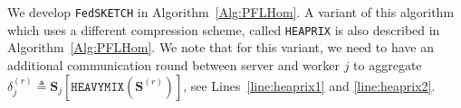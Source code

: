 \documentclass[twoside]{article}
\begin{document}
We develop \texttt{FedSKETCH} in Algorithm~\ref{Alg:PFLHom}. 
A variant of this algorithm which uses a different compression scheme, called \texttt{HEAPRIX} is also described in Algorithm~\ref{Alg:PFLHom}. 
We note that for this variant, we need to have an additional communication round between server and worker $j$ to aggregate $\delta_j^{(r)}\triangleq \mathbf{S}_j\left[\texttt{HEAVYMIX}(\mathbf{S}^{(r)})\right]$, see Lines~\ref{line:heaprix1} and \ref{line:heaprix2}.
\end{document}
